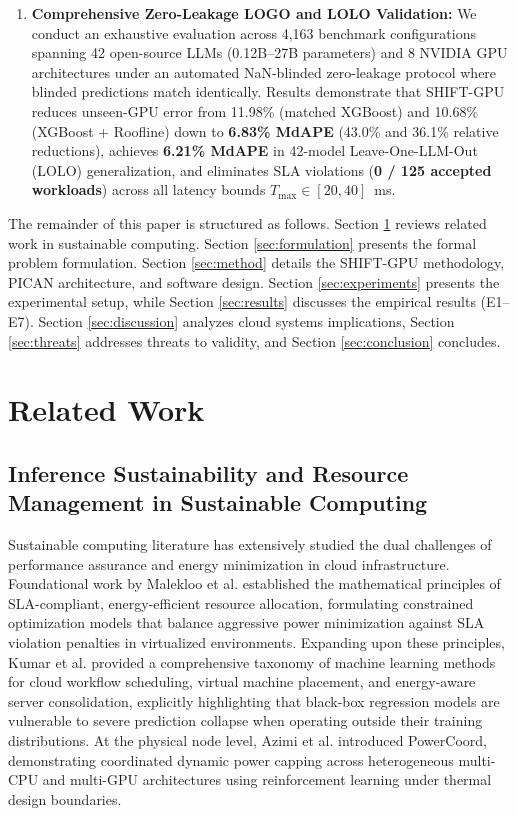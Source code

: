 \documentclass[preprint,12pt]{elsarticle}
\begin{document}
\begin{enumerate}
    \item \textbf{Comprehensive Zero-Leakage LOGO and LOLO Validation:} We conduct an exhaustive evaluation across 4,163 benchmark configurations spanning 42 open-source LLMs (0.12B--27B parameters) and 8 NVIDIA GPU architectures under an automated NaN-blinded zero-leakage protocol where blinded predictions match identically. Results demonstrate that SHIFT-GPU reduces unseen-GPU error from 11.98\% (matched XGBoost) and 10.68\% (XGBoost + Roofline) down to \textbf{6.83\% MdAPE} (43.0\% and 36.1\% relative reductions), achieves \textbf{6.21\% MdAPE} in 42-model Leave-One-LLM-Out (LOLO) generalization, and eliminates SLA violations (\textbf{0 / 125 accepted workloads}) across all latency bounds $T_{\max} \in [20, 40]$~ms.
\end{enumerate}

The remainder of this paper is structured as follows. Section \ref{sec:related} reviews related work in sustainable computing. Section \ref{sec:formulation} presents the formal problem formulation. Section \ref{sec:method} details the SHIFT-GPU methodology, PICAN architecture, and software design. Section \ref{sec:experiments} presents the experimental setup, while Section \ref{sec:results} discusses the empirical results (E1--E7). Section \ref{sec:discussion} analyzes cloud systems implications, Section \ref{sec:threats} addresses threats to validity, and Section \ref{sec:conclusion} concludes.

\section{Related Work}
\label{sec:related}

\subsection{Inference Sustainability and Resource Management in Sustainable Computing}
Sustainable computing literature has extensively studied the dual challenges of performance assurance and energy minimization in cloud infrastructure. Foundational work by Malekloo et al. \citep{suscom_malekloo2018} established the mathematical principles of SLA-compliant, energy-efficient resource allocation, formulating constrained optimization models that balance aggressive power minimization against SLA violation penalties in virtualized environments. Expanding upon these principles, Kumar et al. \citep{suscom_kumar2022} provided a comprehensive taxonomy of machine learning methods for cloud workflow scheduling, virtual machine placement, and energy-aware server consolidation, explicitly highlighting that black-box regression models are vulnerable to severe prediction collapse when operating outside their training distributions. At the physical node level, Azimi et al. \citep{suscom_powercoord2020} introduced PowerCoord, demonstrating coordinated dynamic power capping across heterogeneous multi-CPU and multi-GPU architectures using reinforcement learning under thermal design boundaries.
\end{document}
